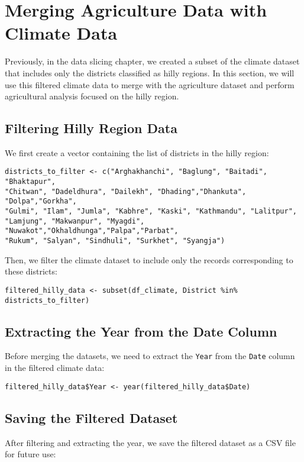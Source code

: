 \section{Merging Agriculture Data with Climate Data}

Previously, in the data slicing chapter, we created a subset of the climate dataset that includes only the districts classified as hilly regions. In this section, we will use this filtered climate data to merge with the agriculture dataset and perform agricultural analysis focused on the hilly region.

\subsection*{Filtering Hilly Region Data}
We first create a vector containing the list of districts in the hilly region:

\begin{verbatim}
districts_to_filter <- c("Arghakhanchi", "Baglung", "Baitadi", "Bhaktapur",
"Chitwan", "Dadeldhura", "Dailekh", "Dhading","Dhankuta", "Dolpa","Gorkha",
"Gulmi", "Ilam", "Jumla", "Kabhre", "Kaski", "Kathmandu", "Lalitpur",
"Lamjung", "Makwanpur", "Myagdi", "Nuwakot","Okhaldhunga","Palpa","Parbat",
"Rukum", "Salyan", "Sindhuli", "Surkhet", "Syangja")
\end{verbatim}

Then, we filter the climate dataset to include only the records corresponding to these districts:

\begin{verbatim}
filtered_hilly_data <- subset(df_climate, District %in% districts_to_filter)
\end{verbatim}

\subsection*{Extracting the Year from the Date Column}
Before merging the datasets, we need to extract the \texttt{Year} from the \texttt{Date} column in the filtered climate data:

\begin{verbatim}
filtered_hilly_data$Year <- year(filtered_hilly_data$Date)
\end{verbatim}

\subsection*{Saving the Filtered Dataset}
After filtering and extracting the year, we save the filtered dataset as a CSV file for future use:

